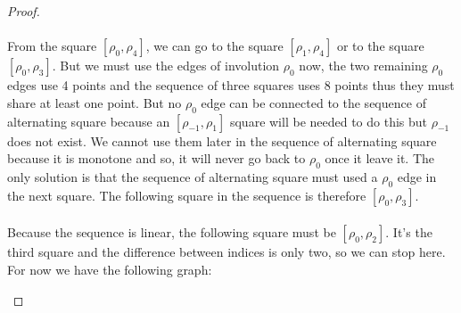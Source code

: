 \begin{proof}
  \paragraph{}
  From the square $[\rho_0, \rho_4]$, we can go to the square $[\rho_1, \rho_4]$ or to the square $[\rho_0, \rho_3]$. But we must use the edges of involution $\rho_0$ now, the two remaining $\rho_0$ edges use 4 points and the sequence of three squares uses 8 points thus they must share at least one point. But no $\rho_0$ edge can be connected to the sequence of alternating square because an $[\rho_{-1}, \rho_1]$ square will be needed to do this but $\rho_{-1}$ does not exist. We cannot use them later in the sequence of alternating square because it is monotone and so, it will never go back to $\rho_0$ once it leave it. The only solution is that the sequence of alternating square must used a $\rho_0$ edge in the next square. The following square in the sequence is therefore $[\rho_0, \rho_3]$.

  \paragraph{}
  Because the sequence is linear, the following square must be $[\rho_0, \rho_2]$. It's the third square and the difference between indices is only two, so we can stop here. For now we have the following graph:


  \begin{figure}[H]
    \begin{center}
\end{center}
\end{figure}
\end{proof}
